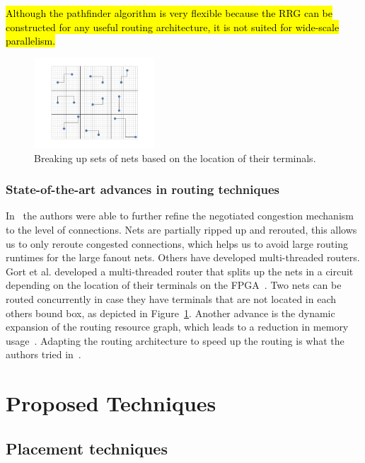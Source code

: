 \documentclass[a4paper,oneside,12pt]{article}
\begin{document}
\hl{Although the {\sc pathfinder} algorithm is very flexible because the RRG can be constructed for any useful routing architecture, it is not suited for wide-scale parallelism.}

\begin{figure}[ht]
\centering
\includegraphics[width = 0.4\textwidth,trim = 0mm 0mm 0mm 0mm, clip]{parallellisatie}
\caption{Breaking up sets of nets based on the location of their terminals.}
\label{geopara}
\end{figure}

\subsubsection{State-of-the-art advances in routing techniques}
In~\cite{vansteenkiste2013connection} the authors were able to further refine the negotiated congestion mechanism to the level of connections. Nets are partially ripped up and rerouted, this allows us to only reroute congested connections, which helps us to avoid large routing runtimes for the large fanout nets. Others have developed multi-threaded routers. Gort et al. developed a multi-threaded router that splits up the nets in a circuit depending on the location of their terminals on the FPGA~\cite{gort2010deterministic}. Two nets can be routed concurrently in case they have terminals that are not located in each others bound box, as depicted in Figure~\ref{geopara}.
Another advance is the dynamic expansion of the routing resource graph, which leads to a reduction in memory usage~\cite{moctar2015fast}. 	
Adapting the routing architecture to speed up the routing is what the authors tried in~\cite{gort2013combined}.


\section{Proposed Techniques}


\subsection{Placement techniques}\label{placetech}
\end{document}
